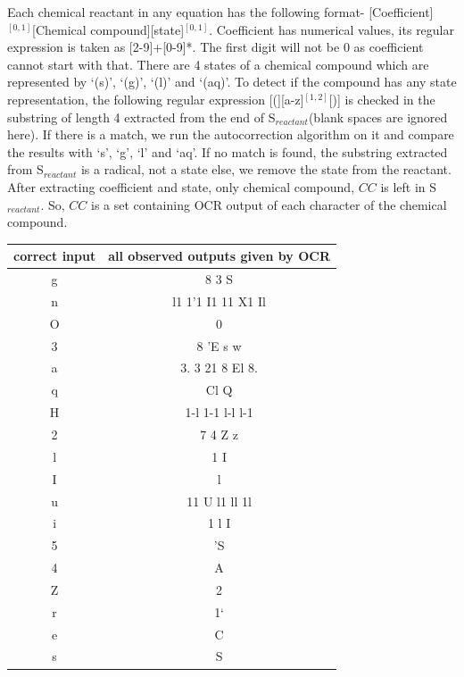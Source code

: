 \documentclass[conference]{IEEEtran}
\begin{document}
Each chemical reactant in any equation has the following format-
[Coefficient]$^{[0,1]}$[Chemical compound][state]$^{[0,1]}$. Coefficient has numerical values, its regular expression is taken as [2-9]+[0-9]*. The first digit will not be 0 as coefficient cannot start with that. There are 4 states of a chemical compound which are represented by `(s)', `(g)', `(l)' and `(aq)'. To detect if the compound has any state representation, the following regular expression [(][a-z]$^{[1,2]}$[)] is checked in the substring of length 4 extracted from the end of S$_{reactant}$(blank spaces are ignored here). If there is a match, we run the autocorrection algorithm on it and compare the results with `s', `g', `l' and `aq'. If no match is found, the substring extracted from S$_{reactant}$ is a radical, not a state else, we remove the state from the reactant. After extracting coefficient and state, only chemical compound, $CC$ is left in S$_{reactant}$. So, $CC$ is a set containing OCR output of each character of the  chemical compound.


\begin{table}
\begin{center}
 \begin{tabular}{|| c | c ||}
 \hline
 correct input & all observed outputs given by OCR\\
 \hline
 g & 8 3 S\\
 \hline
 n & l1 1'1 I1 11 X1 Il\\
 \hline
O & 0\\
\hline
3 & 8 'E s w \\
\hline
a & 3. 3 21 8 El 8. \\
\hline
q & Cl Q \\
\hline
H & 1-l 1-1 l-l l-1\\
\hline
2 & 7 4 Z z\\
\hline
l & 1 I\\
\hline
I & l\\
\hline
u & 11 U l1 ll 1l \\
\hline
i & 1 l I\\
\hline
5 & 'S \\
\hline
4 & A\\
\hline
Z & 2 \\
\hline
r & 1‘\\
\hline
e & C\\
\hline
s & S\\
 \hline
 \end{tabular}
 \end{center}
 \label{table:errorTable}
 \end{table}
\end{document}
